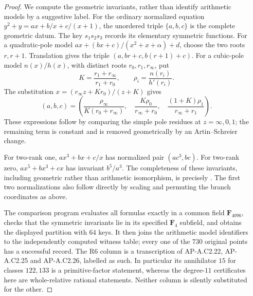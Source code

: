 \documentclass[11pt]{article}
\begin{document}
\begin{proof}
We compute the geometric invariants, rather than identify arithmetic
models by a suggestive label. For the ordinary normalized equation
$y^2+y=ax+b/x+c/(x+1)$, the unordered triple $\{a,b,c\}$ is
the complete geometric datum. The key $s_1s_2s_3$ records its
elementary symmetric functions. For a quadratic-pole model
$ax+(bx+c)/(x^2+x+\alpha)+d$, choose the two roots $r,r+1$.
Translation gives the triple $(a,br+c,b(r+1)+c)$.
For a cubic-pole model $n(x)/h(x)$, with distinct roots
$r_0,r_1,r_\infty$, put
\[
 K=\frac{r_1+r_\infty}{r_1+r_0},\qquad
 \rho_i=\frac{n(r_i)}{h'(r_i)}.
\]
The substitution $x=(r_\infty z+Kr_0)/(z+K)$ gives
\[
 (a,b,c)=\left(
 \frac{\rho_\infty}{K(r_0+r_\infty)},\quad
 \frac{K\rho_0}{r_\infty+r_0},\quad
 \frac{(1+K)\rho_1}{r_\infty+r_1}\right).
\]
These expressions follow by comparing the simple pole residues at
$z=\infty,0,1$; the remaining term is constant and is removed
geometrically by an Artin--Schreier change.

For two-rank one, $ax^3+bx+c/x$ has normalized pair
$(ac^3,bc)$. For two-rank zero, $ax^5+bx^3+cx$ has invariant
$b^5/a^3$. The completeness of these invariants, including
geometric rather than arithmetic isomorphism, is precisely
\cite[Definition~19, Theorems~20 and~22, Corollary~23]{AR_CNP2005}.
The first two normalizations also follow directly by scaling and
permuting the branch coordinates as above.

The comparison program evaluates all formulas exactly in a common
field $\mathbf F_{4096}$, checks that the symmetric invariants lie
in its specified $\mathbf F_4$ subfield, and obtains the displayed
partition with $64$ keys. It then joins the arithmetic model
identifiers to the independently computed witness table; every
one of the $730$ original points has a successful record.
The R6 column is a transcription of AP-A.C2.22, AP-A.C2.25 and
AP-A.C2.26, labelled as such. In particular its annihilator $15$
for classes $122,133$ is a primitive-factor statement, whereas
the degree-$11$ certificates here are whole-relative rational
statements. Neither column is silently substituted for the other.
\end{proof}
\end{document}
